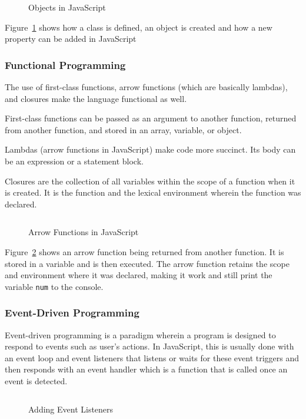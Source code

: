 \documentclass{article}
\newcommand{\js}[1]{\inputminted{javascript}{samples/js/#1.js}}
\newcommand{\jsin}[1]{\texttt{#1}}
\begin{document}
  \begin{figure}[ht]
    \js{oop}
    \caption{Objects in JavaScript}
    \label{fig:oop}
  \end{figure}

  Figure~\ref{fig:oop} shows how a class is defined, an object is created and
  how a new property can be added in JavaScript

  \subsubsection{Functional Programming}
  The use of first-class functions, arrow functions (which are basically
  lambdas), and closures make the language functional as well.

  First-class functions can be passed as an argument to another function,
  returned from another function, and stored in an array, variable, or object.

  Lambdas (arrow functions in JavaScript) make code more succinct. Its body can
  be an expression or a statement block.

  Closures are the collection of all variables within the scope of a function
  when it is created. It is the function and the lexical environment wherein the
  function was declared.

  \begin{figure}[ht]
    \js{arrow}
    \caption{Arrow Functions in JavaScript}
    \label{fig:arrow}
  \end{figure}

  Figure~\ref{fig:arrow} shows an arrow function being returned from another
  function. It is stored in a variable and is then executed. The arrow function
  retains the scope and environment where it was declared, making it work and
  still print the variable \jsin{num} to the console.

  \subsubsection{Event-Driven Programming}
  Event-driven programming is a paradigm wherein a program is designed to
  respond to events such as user’s actions. In JavaScript, this is usually done
  with an event loop and event listeners that listens or waits for these event
  triggers and then responds with an event handler which is a function that is
  called once an event is detected.

  \begin{figure}[ht]
    \js{events}
    \caption{Adding Event Listeners}
    \label{fig:events}
  \end{figure}
\end{document}
